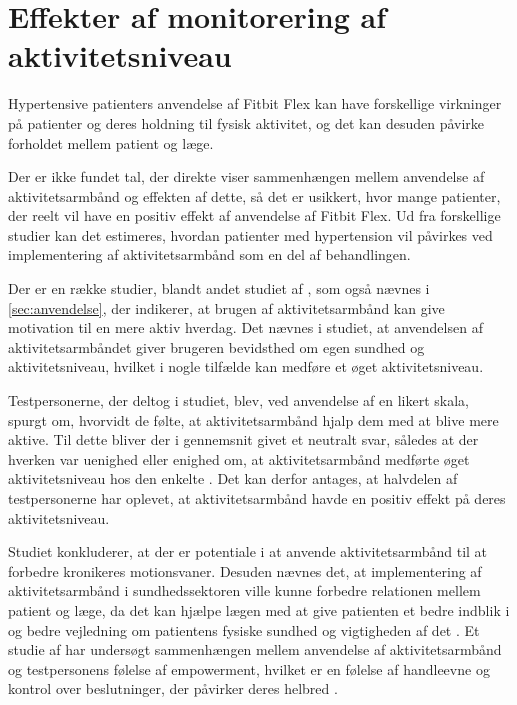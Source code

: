 \section{Effekter af monitorering af aktivitetsniveau}

Hypertensive patienters anvendelse af Fitbit Flex kan have forskellige virkninger på patienter og deres holdning til fysisk aktivitet, og det kan desuden påvirke forholdet mellem patient og læge.

Der er ikke fundet tal, der direkte viser sammenhængen mellem anvendelse af aktivitetsarmbånd og effekten af dette, så det er usikkert, hvor mange patienter, der reelt vil have en positiv effekt af anvendelse af Fitbit Flex. Ud fra forskellige studier kan det estimeres, hvordan patienter med hypertension vil påvirkes ved implementering af aktivitetsarmbånd som en del af behandlingen.

Der er en række studier, blandt andet studiet af \citeauthor{mercer2016}, som også nævnes i  \autoref{sec:anvendelse}, der indikerer, at brugen af aktivitetsarmbånd kan give motivation til en mere aktiv hverdag. Det nævnes i studiet, at anvendelsen af aktivitetsarmbåndet giver brugeren bevidsthed om egen sundhed og aktivitetsniveau, hvilket i nogle tilfælde kan medføre et øget aktivitetsniveau. 

Testpersonerne, der deltog i studiet, blev, ved anvendelse af en likert skala, spurgt om, hvorvidt de følte, at aktivitetsarmbånd hjalp dem med at blive mere aktive. Til dette bliver der i gennemsnit givet et neutralt svar, således at der hverken var uenighed eller enighed om, at aktivitetsarmbånd medførte øget aktivitetsniveau hos den enkelte \citep{mercer2016}. Det kan derfor antages, at halvdelen af testpersonerne har oplevet, at aktivitetsarmbånd havde en positiv effekt på deres aktivitetsniveau.

Studiet konkluderer, at der er potentiale i at anvende aktivitetsarmbånd til at forbedre kronikeres motionsvaner. Desuden nævnes det, at implementering af aktivitetsarmbånd i sundhedssektoren ville kunne forbedre relationen mellem patient og læge, da det kan hjælpe lægen med at give patienten et bedre indblik i og bedre vejledning om patientens fysiske sundhed og vigtigheden af det \citep{mercer2016}. 
Et studie af \citeauthor{nelson2016} har undersøgt sammenhængen mellem anvendelse af aktivitetsarmbånd og testpersonens følelse af empowerment, hvilket er en følelse af handleevne og kontrol over beslutninger, der påvirker deres helbred \citep{toennesen2005}.

